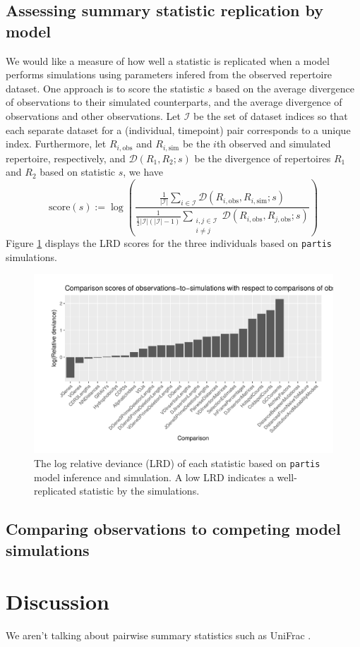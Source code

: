 \documentclass{article}
\begin{document}
\subsection*{Assessing summary statistic replication by model}
We would like a measure of how well a statistic is replicated when a model performs simulations using parameters infered from the observed repertoire dataset.
One approach is to score the statistic $s$ based on the average divergence of observations to their simulated counterparts, and the average divergence of observations and other observations.
Let $\mathcal I$ be the set of dataset indices so that each separate dataset for a (individual, timepoint) pair corresponds to a unique index.
Furthermore, let $R_{i, \text{obs}}$ and $R_{i, \text{sim}}$ be the $i$th observed and simulated repertoire, respectively, and $\mathcal D(R_1, R_2; s)$ be the divergence of repertoires $R_1$ and $R_2$ based on statistic $s$, we have
\begin{equation}
    \text{score}(s) := \log \left( \frac{ \frac{1}{|\mathcal I|} \sum_{i \in \mathcal I} \mathcal D \left( R_{i, \text{obs}}, R_{i, \text{sim}} ; s\right) }
    { \frac{1}{\frac{1}{2} |\mathcal I|\left(|\mathcal I| - 1\right)}
        \sum_{\substack{i, j \in \mathcal I \\ i \ne j}} \mathcal D\left(R_{i, \text{obs}}, R_{j, \text{obs}}; s\right) } \right)
\end{equation}
Figure \ref{Scores} displays the LRD scores for the three individuals based on \texttt{partis} simulations.
\begin{figure}
    \includegraphics[width=\linewidth]{Figures/score_plot.pdf}
    \caption{The log relative deviance (LRD) of each statistic based on \texttt{partis} model inference and simulation.
        A low LRD indicates a well-replicated statistic by the simulations.
    }
    \label{Scores}
\end{figure}

\subsection*{Comparing observations to competing model simulations}

\section*{Discussion}
We aren't talking about pairwise summary statistics such as UniFrac \cite{De_Bourcy2017-pu}.




\end{document}
